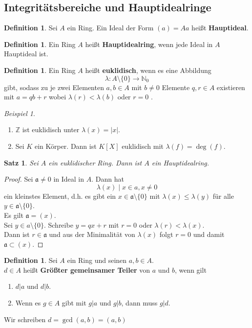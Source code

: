 \documentclass[10pt,a4paper]{article}
\newcommand{\N}{\ensuremath{\mathbb{N}}}
\newcommand{\Z}{\ensuremath{\mathbb{Z}}}
\newcommand{\la}{\ensuremath{\lambda}}
\theoremstyle{plain}
\newtheorem{satz}[theorem]{Satz}
\theoremstyle{definition}
\newtheorem{definition}[theorem]{Definition}
\theoremstyle{remark}
\newtheorem{exm}[theorem]{Beispiel}
\begin{document}
	\subsection{Integritätsbereiche und Hauptidealringe}
	\begin{definition}
		Sei $A$ ein Ring. Ein Ideal der Form $(a)=Aa$ heißt \textbf{Hauptideal}.
	\end{definition}

	\begin{definition}
		Ein Ring $A$ heißt \textbf{Hauptidealring}, wenn jede Ideal in $A$ Hauptideal ist.
	\end{definition}

	\begin{definition}
		Ein Ring $A$ heißt \textbf{euklidisch}, wenn es eine Abbildung 
		\[\la:A\setminus \{0\}\to \N_0\]
		gibt, sodass zu je zwei Elementen $a,b\in A$ mit $b\neq 0$ Elemente $q,r\in A$ existieren mit $a=qb+r$ wobei $\la(r)<\la(b)$ oder $r=0$ .
	\end{definition}

	\begin{exm}
		\begin{enumerate}
			\item $\Z$ ist euklidisch unter $\la(x)=|x|$.
			\item Sei $K$ ein Körper. Dann ist $K[X]$ euklidisch mit $\la(f)=\deg(f)$.
		\end{enumerate}
	\end{exm}

	\begin{satz}
		Sei $A$ ein euklidischer Ring. Dann ist $A$ ein Hauptidealring.
	\end{satz}
	\begin{proof}
		Sei $\mathfrak a\neq 0$ in Ideal in $A$. Dann hat
		\[\la(x)\mid x\in a,x\neq 0\] ein kleinstes Element, d.h. es gibt ein $x\in \mathfrak a\setminus\{0\}$ mit $\la(x)\leq\la(y)$ für alle $y\in \mathfrak a\setminus \{0\}$.\\
		Es gilt $\mathfrak a=(x)$.\\
		Sei $y\in a\setminus\{0\}$. Schreibe $y=qx+r$ mit $r=0$ oder $\la(r)<\la(x)$.\\
		Dann ist $r\in\mathfrak a$ und aus der Minimalität von $\la(x)$ folgt $r=0$ und damit $\mathfrak a\subset (x)$.
	\end{proof}

	\begin{definition}
		Sei $A$ ein Ring und seinen $a,b\in A$.\\
		$d\in A$ heißt \textbf{Größter gemeinsamer Teiler} von $a$ und $b$, wenn gilt
		\begin{enumerate}
			\item $d|a$ und $d|b$.
			\item Wenn es $g\in A$ gibt mit $g|a$ und $g|b$, dann muss $g|d$.
		\end{enumerate}
		Wir schreiben $d=\gcd(a,b)=(a,b)$
	\end{definition}
\end{document}
